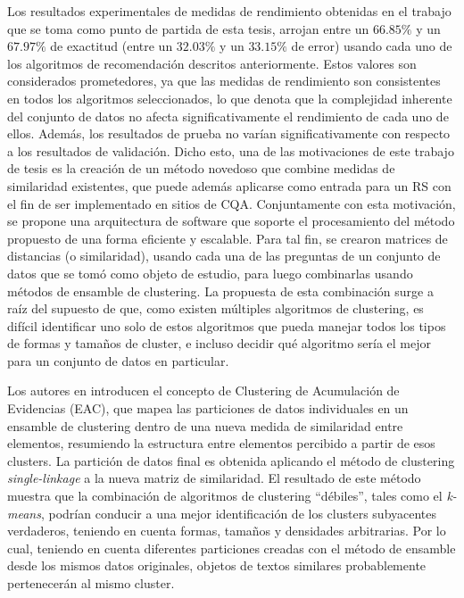 \bigskip Los resultados experimentales de medidas de rendimiento obtenidas en el trabajo que se toma como punto de partida de esta tesis, arrojan entre un \(66.85\%\) y un \(67.97\%\) de exactitud (entre un \(32.03\%\) y un \(33.15\%\) de error) usando cada uno de los algoritmos de recomendación descritos anteriormente. Estos valores son considerados prometedores, ya que las medidas de rendimiento son consistentes en todos los algoritmos seleccionados, lo que denota que la complejidad inherente del conjunto de datos no afecta significativamente el rendimiento de cada uno de ellos. Además, los resultados de prueba no varían significativamente con respecto a los resultados de validación. Dicho esto, una de las motivaciones de este trabajo de tesis es la creación de un método novedoso que combine medidas de similaridad existentes, que puede además aplicarse como entrada para un RS con el fin de ser implementado en sitios de CQA. Conjuntamente con esta motivación, se propone una arquitectura de software que soporte el procesamiento del método propuesto de una forma eficiente y escalable. Para tal fin, se crearon matrices de distancias (o similaridad), usando cada una de las preguntas de un conjunto de datos que se tomó como objeto de estudio, para luego combinarlas usando métodos de ensamble de clustering. La propuesta de esta combinación surge a raíz del supuesto de que, como existen múltiples algoritmos de clustering, es difícil identificar uno solo de estos algoritmos que pueda manejar todos los tipos de formas y tamaños de cluster, e incluso decidir qué algoritmo sería el mejor para un conjunto de datos en particular.

\bigskip Los autores en \citep{fred2005combining} introducen el concepto de Clustering de Acumulación de Evidencias (EAC), que mapea las particiones de datos individuales en un ensamble de clustering dentro de una nueva medida de similaridad entre elementos, resumiendo la estructura entre elementos percibido a partir de esos clusters. La partición de datos final es obtenida aplicando el método de clustering \textit{single-linkage} a la nueva matriz de similaridad. El resultado de este método muestra que la combinación de algoritmos de clustering “débiles”, tales como el \textit{k-means}, podrían conducir a una mejor identificación de los clusters subyacentes verdaderos, teniendo en cuenta formas, tamaños y densidades arbitrarias. Por lo cual, teniendo en cuenta diferentes particiones creadas con el método de ensamble desde los mismos datos originales, objetos de textos similares probablemente pertenecerán al mismo cluster.

